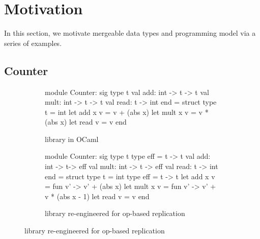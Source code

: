 \section{Motivation}

In this section, we motivate mergeable data types and \name
programming model via a series of examples. 

\subsection{Counter}

\begin{figure}

\begin{subfigure}[b]{0.4\textwidth}
  \begin{ocaml}
    module Counter: sig
      type t
      val add: int -> t -> t
      val mult: int -> t -> t
      val read: t -> int
    end = struct
      type t = int
      let add x v = v + (abs x)
      let mult x v = v * (abs x)
      let read v = v
    end
  \end{ocaml}

\caption{ library in OCaml}
\label{fig:counter-adt}
\end{subfigure}
\begin{subfigure}[b]{0.56\textwidth}
  \begin{ocaml}
    module Counter: sig
      type t
      type eff = t -> t
      val add: int -> t-> eff
      val mult: int -> t -> eff
      val read: t -> int
    end = struct
      type t = int
      type eff = t -> t
      let add x v = fun v' -> v' + (abs x)
      let mult x v = 
        fun v' -> v' + v * (abs x - 1) 
      let read v = v
    end
  \end{ocaml}

\caption{ library re-engineered for op-based replication}
\label{fig:counter-rdt}
\end{subfigure}


\end{figure}

